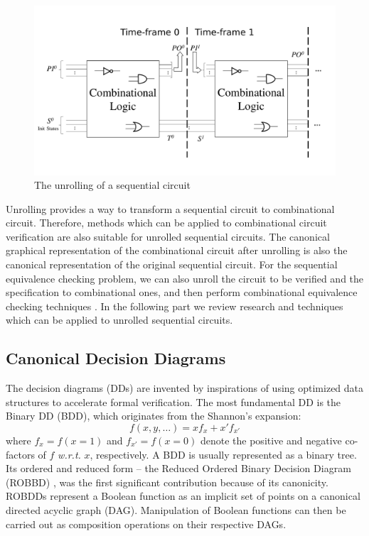 \begin{figure}[h]
\centerline{
\includegraphics[width=\textwidth]{newfig/unroll.pdf}
}
\caption{The unrolling of a sequential circuit}
\label{fig:unrolling}
\end{figure}

Unrolling provides a way to transform a sequential circuit to combinational 
circuit. Therefore,  methods which can be applied to combinational circuit 
verification are also suitable for unrolled sequential circuits. The canonical 
graphical representation of the combinational circuit after unrolling is also 
the canonical representation of the original sequential circuit. For the sequential 
equivalence checking problem, we can also unroll the circuit to be verified and the 
specification to combinational ones, and then perform combinational equivalence checking
techniques \cite{savoj2010combinational}. In the following part we review research and techniques which 
can be applied to unrolled sequential circuits.

\subsection{Canonical Decision Diagrams}
The decision diagrams (DDs) are invented by inspirations of 
using optimized data structures to accelerate formal verification.
The most fundamental DD is the Binary DD (BDD), which originates from the 
Shannon's expansion:
\begin{equation}
f(x, y, \dots) = x f_x + x' f_{x'}
\end{equation}
where $f_x = f(x = 1)$ and $f_{x'} = f(x = 0)$ denote the positive and
negative co-factors of $f$ {\it w.r.t.} $x$, respectively.
A BDD is usually represented as a binary tree.
Its ordered and reduced form -- the Reduced Ordered Binary Decision Diagram (ROBBD)
\cite{BRYA86}, was the first significant contribution because of its canonicity.  
 ROBDDs represent a Boolean function as an
implicit set of points on a canonical directed acyclic graph
(DAG). Manipulation of Boolean functions can then be carried out as
composition operations on their respective DAGs. 

